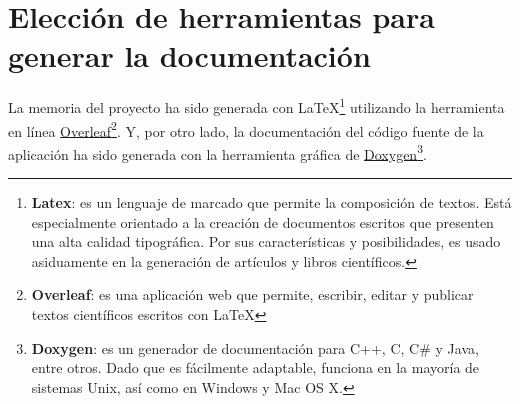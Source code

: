 \section{Elección de herramientas para generar la documentación}
La memoria del proyecto ha sido generada con \LaTeX{}\footnote{\textbf{Latex}: es un lenguaje de marcado que permite la composición de textos. Está especialmente orientado a la creación de documentos escritos que presenten una alta calidad tipográfica. Por sus características y posibilidades, es usado asiduamente en la generación de artículos y libros científicos.} utilizando la herramienta en línea \href{http://www.overleaf.com}{Overleaf}\footnote{\textbf{Overleaf}: es una aplicación web que permite, escribir, editar y publicar textos científicos escritos con \LaTeX{}}.
Y, por otro lado, la documentación del código fuente de la aplicación ha sido generada con la herramienta gráfica de \href{https://www.doxygen.nl/index.html}{Doxygen}\footnote{\textbf{Doxygen}: es un generador de documentación para C++, C, C\# y Java, entre otros. Dado que es fácilmente adaptable, funciona en la mayoría de sistemas Unix, así como en Windows y Mac OS X.}.
